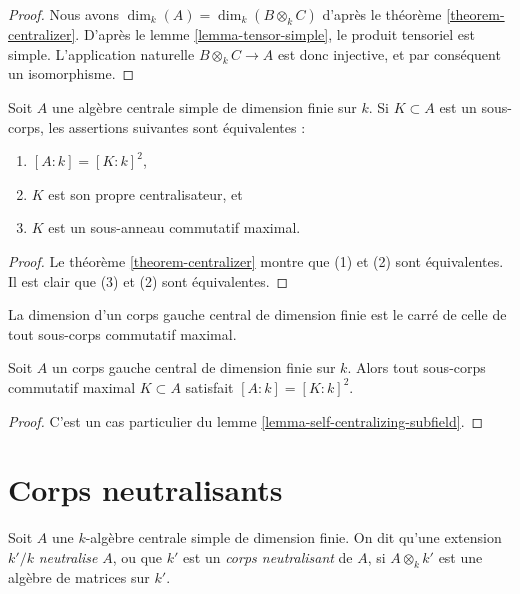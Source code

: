 \begin{proof}
Nous avons $\dim_k(A) = \dim_k(B \otimes_k C)$ d'après le
théorème \ref{theorem-centralizer}. D'après le
lemme \ref{lemma-tensor-simple},
le produit tensoriel est simple. L'application naturelle
$B \otimes_k C \to A$ est donc injective, et par conséquent un isomorphisme.
\end{proof}

\begin{lemma}
\label{lemma-self-centralizing-subfield}
Soit $A$ une algèbre centrale simple de dimension finie sur $k$.
Si $K \subset A$ est un sous-corps, les assertions suivantes sont équivalentes :
\begin{enumerate}
\item $[A : k] = [K : k]^2$,
\item $K$ est son propre centralisateur, et
\item $K$ est un sous-anneau commutatif maximal.
\end{enumerate}
\end{lemma}

\begin{proof}
Le théorème \ref{theorem-centralizer}
montre que (1) et (2) sont équivalentes.
Il est clair que (3) et (2) sont équivalentes.
\end{proof}

\begin{lemma}
\label{lemma-maximal-subfield}
\begin{slogan}
La dimension d'un corps gauche central de dimension finie est le carré de celle
de tout sous-corps commutatif maximal.
\end{slogan}
Soit $A$ un corps gauche central de dimension finie sur $k$.
Alors tout sous-corps commutatif maximal $K \subset A$ satisfait
$[A : k] = [K : k]^2$.
\end{lemma}

\begin{proof}
C'est un cas particulier du lemme \ref{lemma-self-centralizing-subfield}.
\end{proof}





\section{Corps neutralisants}
\label{section-splitting}


\begin{definition}
\label{definition-splitting}
Soit $A$ une $k$-algèbre centrale simple de dimension finie.
On dit qu'une extension $k'/k$ {\it neutralise} $A$, ou que
$k'$ est un {\it corps neutralisant} de $A$, si $A \otimes_k k'$ est
une algèbre de matrices sur $k'$.
\end{definition}

